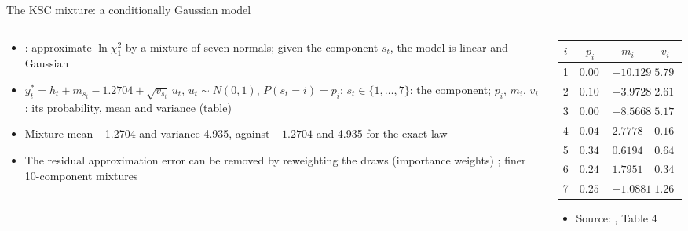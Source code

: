 \begin{frame}{The KSC mixture: a conditionally Gaussian model}
\itemsize{\footnotesize}
\begin{columns}[T]
\begin{column}{0.55\textwidth}
\begin{itemize}
    \item {}: approximate $\ln\chi^2_1$ by a mixture of seven normals; given the component $s_t$, the model is linear and Gaussian
    \item $y^*_t = h_t + m_{s_t} - 1.2704 + \sqrt{v_{s_t}}\,u_t$, $u_t \sim N(0, 1)$, $P(s_t = i) = p_i$; $s_t \in \{1, \dots, 7\}$: the component; $p_i$, $m_i$, $v_i$: its probability, mean and variance (table)
    \item Mixture mean \ensuremath{-}1.2704 and variance 4.935, against $-1.2704$ and 4.935 for the exact law
    \item The residual approximation error can be removed by reweighting the draws (importance weights) ; finer 10-component mixtures 
\end{itemize}
\end{column}
\begin{column}{0.42\textwidth}
\begin{center}
\scriptsize
\begin{tabular}{cccc}
\toprule
$i$ & $p_i$ & $m_i$ & $v_i$ \\
\midrule
1 & $0.00730$ & $-10.12999$ & $5.79596$ \\
2 & $0.10556$ & $-3.97281$ & $2.61369$ \\
3 & $0.00002$ & $-8.56686$ & $5.17950$ \\
4 & $0.04395$ & $2.77786$ & $0.16735$ \\
5 & $0.34001$ & $0.61942$ & $0.64009$ \\
6 & $0.24566$ & $1.79518$ & $0.34023$ \\
7 & $0.25750$ & $-1.08819$ & $1.26261$ \\
\bottomrule
\end{tabular}
\end{center}
\begin{itemize}
    \item Source: , Table 4
\end{itemize}
\end{column}
\end{columns}
\end{frame}

